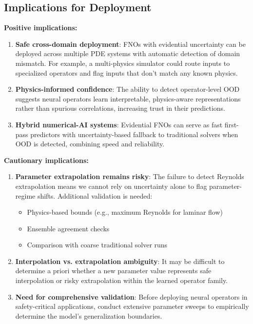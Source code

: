 \subsection{Implications for Deployment}

\textbf{Positive implications:}

\begin{enumerate}
\item \textbf{Safe cross-domain deployment}: FNOs with evidential uncertainty can be deployed across multiple PDE systems with automatic detection of domain mismatch. For example, a multi-physics simulator could route inputs to specialized operators and flag inputs that don't match any known physics.

\item \textbf{Physics-informed confidence}: The ability to detect operator-level OOD suggests neural operators learn interpretable, physics-aware representations rather than spurious correlations, increasing trust in their predictions.

\item \textbf{Hybrid numerical-AI systems}: Evidential FNOs can serve as fast first-pass predictors with uncertainty-based fallback to traditional solvers when OOD is detected, combining speed and reliability.
\end{enumerate}

\textbf{Cautionary implications:}

\begin{enumerate}
\item \textbf{Parameter extrapolation remains risky}: The failure to detect Reynolds extrapolation means we cannot rely on uncertainty alone to flag parameter-regime shifts. Additional validation is needed:
\begin{itemize}
\item Physics-based bounds (e.g., maximum Reynolds for laminar flow)
\item Ensemble agreement checks
\item Comparison with coarse traditional solver runs
\end{itemize}

\item \textbf{Interpolation vs. extrapolation ambiguity}: It may be difficult to determine a priori whether a new parameter value represents safe interpolation or risky extrapolation within the learned operator family.

\item \textbf{Need for comprehensive validation}: Before deploying neural operators in safety-critical applications, conduct extensive parameter sweeps to empirically determine the model's generalization boundaries.
\end{enumerate}

